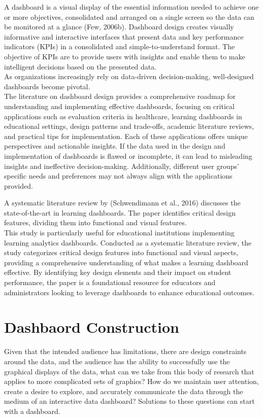 \documentclass[print]{nuthesis}
\begin{document}
A dashboard is a visual display of the essential information needed to achieve one or more objectives, consolidated and arranged on a single screen so the data can be monitored at a glance (Few, 2006b).
Dashboard design creates visually informative and interactive interfaces that present data and key performance indicators (KPIs) in a consolidated and simple-to-understand format.
The objective of KPIs are to provide users with insights and enable them to make intelligent decisions based on the presented data.\\
As organizations increasingly rely on data-driven decision-making, well-designed dashboards become pivotal.\\
The literature on dashboard design provides a comprehensive roadmap for understanding and implementing effective dashboards, focusing on critical applications such as evaluation criteria in healthcare, learning dashboards in educational settings, design patterns and trade-offs, academic literature reviews, and practical tips for implementation.
Each of these applications offers unique perspectives and actionable insights.
If the data used in the design and implementation of dashboards is flawed or incomplete, it can lead to misleading insights and ineffective decision-making.
Additionally, different user groups' specific needs and preferences may not always align with the applications provided.

A systematic literature review by (Schwendimann et al., 2016) discusses the state-of-the-art in learning dashboards.
The paper identifies critical design features, dividing them into functional and visual features.\\
This study is particularly useful for educational institutions implementing learning analytics dashboards.
Conducted as a systematic literature review, the study categorizes critical design features into functional and visual aspects, providing a comprehensive understanding of what makes a learning dashboard effective.
By identifying key design elements and their impact on student performance, the paper is a foundational resource for educators and administrators looking to leverage dashboards to enhance educational outcomes.

\hypertarget{dashbaord-construction}{%
\section{Dashbaord Construction}\label{dashbaord-construction}}

Given that the intended audience has limitations, there are design constraints around the data, and the audience has the ability to successfully use the graphical displays of the data, what can we take from this body of research that applies to more complicated sets of graphics?
How do we maintain user attention, create a desire to explore, and accurately communicate the data through the medium of an interactive data dashboard?
Solutions to these questions can start with a dashboard.
\end{document}
